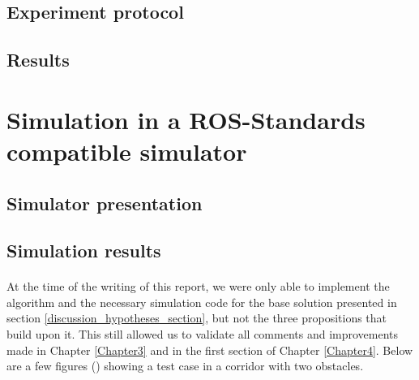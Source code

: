 
\subsection{Experiment protocol}


\subsection{Results}


\section{Simulation in a ROS-Standards compatible simulator}

\subsection{Simulator presentation}



\subsection{Simulation results}

\paragraph{} At the time of the writing of this report, we were only able to implement the algorithm and the necessary simulation code for the base solution presented in section \ref{discussion_hypotheses_section}, but not the three propositions that build upon it. This still allowed us to validate all comments and improvements made in Chapter \ref{Chapter3} and in the first section of Chapter \ref{Chapter4}. Below are a few figures () showing a test case in a corridor with two obstacles.

